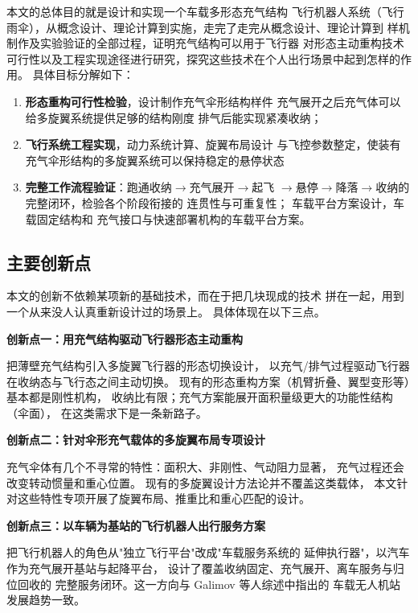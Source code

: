 本文的总体目的就是设计和实现一个车载多形态充气结构
飞行机器人系统（飞行雨伞），从概念设计、理论计算到实施，走完了走完从概念设计、理论计算到
样机制作及实验验证的全部过程，证明充气结构可以用于飞行器
对形态主动重构技术可行性以及工程实现途径进行研究，探究这些技术在个人出行场景中起到怎样的作用。
具体目标分解如下：
\begin{enumerate}
    \item \textbf{形态重构可行性检验}，设计制作充气伞形结构样件
    充气展开之后充气体可以给多旋翼系统提供足够的结构刚度
    排气后能实现紧凑收纳；
    \item \textbf{飞行系统工程实现}，动力系统计算、旋翼布局设计
    与飞控参数整定，使装有充气伞形结构的多旋翼系统可以保持稳定的悬停状态
    \item \textbf{完整工作流程验证}：跑通收纳$\to$充气展开$\to$起飞
    $\to$悬停$\to$降落$\to$收纳的完整闭环，检验各个阶段衔接的
    连贯性与可重复性；
    车载平台方案设计，车载固定结构和
    充气接口与快速部署机构的车载平台方案。
\end{enumerate}

\subsection{主要创新点}

本文的创新不依赖某项新的基础技术，而在于把几块现成的技术
拼在一起，用到一个从来没人认真重新设计过的场景上。
具体体现在以下三点。

\textbf{创新点一：用充气结构驱动飞行器形态主动重构}

把薄壁充气结构引入多旋翼飞行器的形态切换设计，
以充气/排气过程驱动飞行器在收纳态与飞行态之间主动切换。
现有的形态重构方案（机臂折叠、翼型变形等）基本都是刚性机构\cite{liaoxiang2025}，
收纳比有限；充气方案能展开面积量级更大的功能性结构（伞面），
在这类需求下是一条新路子。

\textbf{创新点二：针对伞形充气载体的多旋翼布局专项设计}

充气伞体有几个不寻常的特性：面积大、非刚性、气动阻力显著，
充气过程还会改变转动惯量和重心位置。
现有的多旋翼设计方法论\cite{quanquan2017}并不覆盖这类载体，
本文针对这些特性专项开展了旋翼布局、推重比和重心匹配的设计。

\textbf{创新点三：以车辆为基站的飞行机器人出行服务方案}

把飞行机器人的角色从"独立飞行平台"改成"车载服务系统的
延伸执行器"，以汽车作为充气展开基站与起降平台，
设计了覆盖收纳固定、充气展开、离车服务与归位回收的
完整服务闭环。这一方向与 Galimov 等人综述中指出的
车载无人机站发展趋势一致\cite{galimov2020}。



